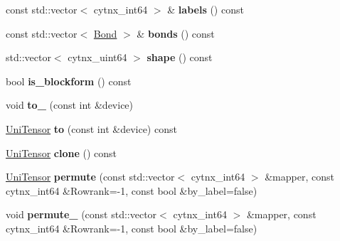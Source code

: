 \begin{DoxyCompactItemize}
\item 
\mbox{\label{classcytnx_1_1UniTensor_a38073b2e56a0902146951155841c85bf}} 
const std\+::vector$<$ cytnx\+\_\+int64 $>$ \& {\bfseries labels} () const
\item 
\mbox{\label{classcytnx_1_1UniTensor_abc8348e0f56e2479dbe45273c3055b1b}} 
const std\+::vector$<$ \hyperlink{classcytnx_1_1Bond}{Bond} $>$ \& {\bfseries bonds} () const
\item 
\mbox{\label{classcytnx_1_1UniTensor_a38e60453fd51add542acdc43c8558f24}} 
std\+::vector$<$ cytnx\+\_\+uint64 $>$ {\bfseries shape} () const
\item 
\mbox{\label{classcytnx_1_1UniTensor_aac44ae40cb93f11f673ac0c1930ae319}} 
bool {\bfseries is\+\_\+blockform} () const
\item 
\mbox{\label{classcytnx_1_1UniTensor_a9aa08f2c848cc7d31bceac7656b4a976}} 
void {\bfseries to\+\_\+} (const int \&device)
\item 
\mbox{\label{classcytnx_1_1UniTensor_a025f4a2d775a9892b7f86aeff364fa49}} 
\hyperlink{classcytnx_1_1UniTensor}{Uni\+Tensor} {\bfseries to} (const int \&device) const
\item 
\mbox{\label{classcytnx_1_1UniTensor_ae1125e6627eb2f5268d5c21944d31434}} 
\hyperlink{classcytnx_1_1UniTensor}{Uni\+Tensor} {\bfseries clone} () const
\item 
\mbox{\label{classcytnx_1_1UniTensor_a77ab3a44a6bfb1ab80de3d186b626d62}} 
\hyperlink{classcytnx_1_1UniTensor}{Uni\+Tensor} {\bfseries permute} (const std\+::vector$<$ cytnx\+\_\+int64 $>$ \&mapper, const cytnx\+\_\+int64 \&Rowrank=-\/1, const bool \&by\+\_\+label=false)
\item 
\mbox{\label{classcytnx_1_1UniTensor_a9fc950c25515e43fd2c6deecc1e66a99}} 
void {\bfseries permute\+\_\+} (const std\+::vector$<$ cytnx\+\_\+int64 $>$ \&mapper, const cytnx\+\_\+int64 \&Rowrank=-\/1, const bool \&by\+\_\+label=false)
\item 

\end{DoxyCompactItemize}
